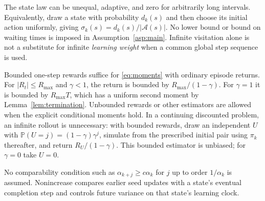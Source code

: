 The state law can be unequal, adaptive, and zero for arbitrarily long intervals. Equivalently, draw a state with probability $d_k(s)$ and then choose its initial action uniformly, giving
$\sigma_k(s)=d_k(s)/|\mathcal A(s)|$. No lower bound or bound on waiting times is imposed in Assumption~\ref{asp:main}.
Infinite visitation alone is not a substitute for infinite \emph{learning weight} when a common global
step sequence is used.

Bounded one-step rewards suffice for \eqref{eq:moments} with ordinary episode returns. For $|R_t|\le R_{\max}$
and $\gamma<1$, the return is bounded by $R_{\max}/(1-\gamma)$. For $\gamma=1$ it is bounded by $R_{\max}T$, which
has a uniform second moment by Lemma~\ref{lem:termination}. Unbounded rewards or other estimators are
allowed when the explicit conditional moments hold. In a continuing discounted problem,
an infinite rollout is unnecessary: with bounded rewards, draw an independent $U$ with
$\mathbb P(U=j)=(1-\gamma)\gamma^j$, simulate from the prescribed initial pair using $\pi_k$ thereafter, and
return $R_U/(1-\gamma)$. This bounded estimator is unbiased; for $\gamma=0$ take $U=0$.

No comparability condition such as $\alpha_{k+j}\ge c\alpha_k$ for $j$ up to order $1/\alpha_k$ is assumed.
Nonincrease compares earlier seed updates with a state's eventual completion step and
controls future variance on that state's learning clock.
